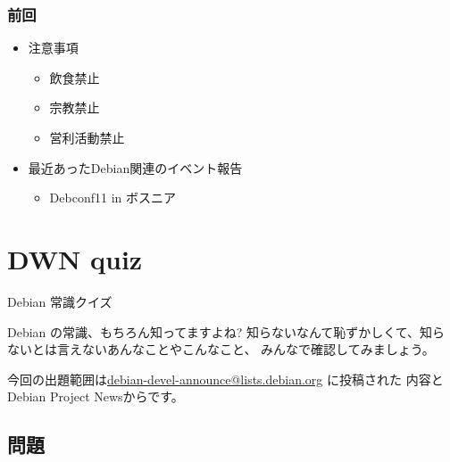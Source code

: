 \begin{frame}
 \frametitle{前回}
\begin{minipage}[t]{0.45\hsize}
  \begin{itemize}
  \item 注意事項
	\begin{itemize}
	 \item 飲食禁止
	 \item 宗教禁止
	 \item 営利活動禁止
	\end{itemize}
  \end{itemize}
\end{minipage}
\begin{minipage}[t]{0.45\hsize}
 \begin{itemize}
  \item 最近あったDebian関連のイベント報告
  \begin{itemize}
   \item Debconf11 in ボスニア
  \end{itemize}
 \end{itemize}
\end{minipage}
\end{frame}




\section{DWN quiz}
\begin{frame}{Debian 常識クイズ}

Debian の常識、もちろん知ってますよね?
知らないなんて恥ずかしくて、知らないとは言えないあんなことやこんなこと、
みんなで確認してみましょう。

今回の出題範囲は\url{debian-devel-announce@lists.debian.org} に投稿された
内容とDebian Project Newsからです。

\end{frame}

\subsection{問題}



{\footnotesize
 
}


